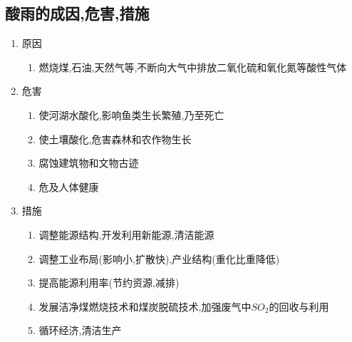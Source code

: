 \documentclass[a4paper]{article}
\begin{document}
    \subsection{酸雨的成因,危害,措施}
    \begin{enumerate}
        \item 原因
        \begin{enumerate}
            \item 燃烧煤,石油,天然气等,不断向大气中排放二氧化硫和氧化氮等酸性气体
        \end{enumerate}
        \item 危害
        \begin{enumerate}
            \item 使河湖水酸化,影响鱼类生长繁殖,乃至死亡
            \item 使土壤酸化,危害森林和农作物生长
            \item 腐蚀建筑物和文物古迹
            \item 危及人体健康
        \end{enumerate}
        \item 措施
        \begin{enumerate}
            \item 调整能源结构,开发利用新能源,清洁能源
            \item 调整工业布局(影响小,扩散快),产业结构(重化比重降低)
            \item 提高能源利用率(节约资源,减排)
            \item 发展洁净煤燃烧技术和煤炭脱硫技术,加强废气中$SO_2$的回收与利用 %
            \item 循环经济,清洁生产
        \end{enumerate}
    \end{enumerate}
\end{document}
